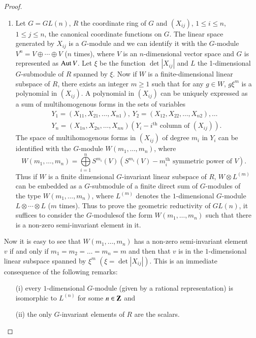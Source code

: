 \begin{proof}
\begin{enumerate}
\item Let $G=GL(n)$, $R$ the coordinate ring of $G$ and $(X_{ij})$, $1\leq i\leq n$, $1\leq j\leq n$, the canonical coordinate functions on $G$. The linear space generated by $X_{ij}$ is a $G$-module and we can identify it with the $G$-module $V^{n}=V\oplus\cdots\oplus V$ ($n$ times), where $V$ is an $n$-dimensional vector space and $G$ is represented as $\operatorname{\mathrm{Aut}} V$. Let $\xi$ be the function $\det |X_{ij}|$ and $L$ the 1-dimensional $G$-submodule of $R$ spanned by $\xi$. Now if $W$ is a finite-dimensional linear subspace of $R$, there exists an integer $m\geq 1$ such that for any $g\in W$, $g\xi^{m}$ is a polynomial in $(X_{ij})$. A polynomial in $(X_{ij})$ can be uniquely expressed as a sum of multihomogenous forms in the sets of variables
\begin{align*}
& Y_{1}=(X_{11},X_{21},\ldots,X_{n1}), \ Y_{2}=(X_{12},X_{22},\ldots,X_{n2}),\ldots\\
& Y_{n}=(X_{1n},X_{2n},\ldots,X_{nn})(Y_{i}-i^{\text{th}}\text{~column of~}(X_{ij})).
\end{align*}
The space of multihomogenous forms in $(X_{ij})$ of degree $m_{i}$ in $Y_{i}$ can be identified with the $G$-module $W(m_{1},\ldots,m_{n})$, where
{\fontsize{10pt}{12pt}\selectfont
$$
W(m_{1},\ldots,m_{n})=\bigoplus\limits^{n}_{i=1}S^{m_{i}}(V)(S^{m_{i}}(V)-m^{\text{th}}_{i}\text{~symmetric power of } V).
$$}\relax
Thus if $W$ is a finite dimensional $G$-invariant linear subspace of $R$, $W\otimes L^{(m)}$ can be embedded as a $G$-submodule of a finite direct sum of $G$-modules of the type $W(m_{1},\ldots,m_{n})$, where $L^{(m)}$ denotes the $1$-dimensional $G$-module $L\otimes\cdots\otimes L$ ($m$ times). Thus to prove the geometric reductivity of $GL(n)$, it suffices to consider the $G$-modules\pageoriginale of the form $W(m_{1},\ldots,m_{n})$ such that there is a non-zero semi-invariant element in it.
\end{enumerate}

Now it is easy to see that $W(m_{1},\ldots,m_{n})$ has a non-zero semi-inva\-riant element $v$ if and only if $m_{1}=m_{2}=\ldots=m_{n}=m$ and then that $v$ is in the $1$-dimensional linear subspace spanned by $\xi^{m}$ $(\xi=\det |X_{ij}|)$. This is an immediate consequence of the following remarks:
\begin{itemize}
\item[(i)] every $1$-dimensional $G$-module (given by a rational representation) is isomorphic to $L^{(n)}$ for some $n\in \mathbf{Z}$ and

\item[(ii)] the only $G$-invariant elements of $R$ are the scalars.
 

\end{itemize}
\end{proof}
